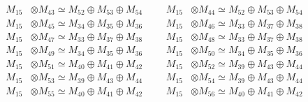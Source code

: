 \begin{align*}
M_{15} &\otimes M_{43} \simeq M_{52} \oplus M_{53} \oplus M_{54} &&& M_{15} &\otimes M_{44} \simeq M_{52} \oplus M_{53} \oplus M_{54}\\
M_{15} &\otimes M_{45} \simeq M_{34} \oplus M_{35} \oplus M_{36} &&& M_{15} &\otimes M_{46} \simeq M_{33} \oplus M_{37} \oplus M_{38}\\
M_{15} &\otimes M_{47} \simeq M_{33} \oplus M_{37} \oplus M_{38} &&& M_{15} &\otimes M_{48} \simeq M_{33} \oplus M_{37} \oplus M_{38}\\
M_{15} &\otimes M_{49} \simeq M_{34} \oplus M_{35} \oplus M_{36} &&& M_{15} &\otimes M_{50} \simeq M_{34} \oplus M_{35} \oplus M_{36}\\
M_{15} &\otimes M_{51} \simeq M_{40} \oplus M_{41} \oplus M_{42} &&& M_{15} &\otimes M_{52} \simeq M_{39} \oplus M_{43} \oplus M_{44}\\
M_{15} &\otimes M_{53} \simeq M_{39} \oplus M_{43} \oplus M_{44} &&& M_{15} &\otimes M_{54} \simeq M_{39} \oplus M_{43} \oplus M_{44}\\
M_{15} &\otimes M_{55} \simeq M_{40} \oplus M_{41} \oplus M_{42} &&& M_{15} &\otimes M_{56} \simeq M_{40} \oplus M_{41} \oplus M_{42}\\
\end{align*}

